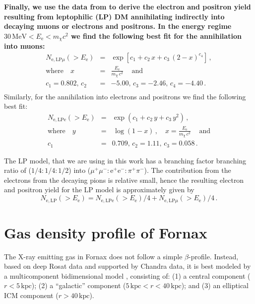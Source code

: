 \documentclass[10pt,aps,pra,reprint,amsmath,amsfonts,amssymb,showpacs,nofootinbib,floatfix]{revtex4-1}
\def\C#1{{\bf #1}}
\newcommand{\rmn}{\mathrm}
\newcommand{\ee}{E_\rmn{e}}
\newcommand{\kpc}{\rmn{kpc}}
\newcommand{\e}{\rmn{e}}
\begin{document}
\C{Finally, we use the data from
  \cite{2011JCAP...03..019C,2011JCAP...03..051C} to derive the
  electron and positron yield resulting from leptophilic (LP) DM
  annihilating indirectly into decaying muons or electrons and
  positrons. In the energy regime $30\,\rmn{MeV}<\ee< m_\chi c^2$ we
  find the following best fit for the annihilation into muons:}
\begin{eqnarray}
N_{\e,\rmn{LP}\mu}(>\ee) &=& \exp\left[c_1+c_2\,x+c_3\,(2-x)^{c_4}\right]
\,,\nonumber\\
\rmn{where}\quad x&=&\frac{\ee}{m_\chi\,c^2}\,\quad\rmn{and}\nonumber\\
c_1=0.802,\,c_2&=&-5.00,\,c_3=-2.46,\,c_4=-4.40\,.\nonumber\\
\label{eq:lp_mu}
\end{eqnarray}
Similarly, for the annihilation into electrons and positrons we find the following best fit:
\begin{eqnarray}
N_{\e,\rmn{LP}\e}(>\ee) &=& \exp\left(c_1+c_2\,y+c_3\,y^2\right)
\,,\nonumber\\
\rmn{where}\quad y&=&\,\log\left(1-x\right)\,,\quad 
x=\frac{\ee}{m_\chi\,c^2}\,\quad\rmn{and}\nonumber\\
c_1&=&0.709,\,c_2=1.11,\,c_3=0.058\,.
\label{eq:lp_ep}
\end{eqnarray}

The LP model, that we are using in this work has a branching factor
branching ratio of ($1/4:1/4:1/2$) into
($\mu^+\mu^-:\e^+\e^-:\pi^+\pi^-$). The contribution from the
electrons from the decaying pions is relative small, hence the
resulting electron and positron yield for the LP model is
approximately given by
\begin{equation}
N_{\e,\rmn{LP}}(>\ee) =
N_{\e,\rmn{LP}\e}(>\ee)/4+N_{\e,\rmn{LP}\mu}(>\ee)/4\,.
\end{equation}

\section{Gas density profile of Fornax}
The X-ray emitting gas in Fornax does not follow a simple
$\beta$-profile. Instead, based on deep Rosat data and supported by
Chandra data, it is best modeled by a multicomponent bidimensional
model \cite{2002ApJ...565..883P}, consisting of: (1) a central
component ($r<5\,\kpc$); (2) a ``galactic'' component
($5\,\kpc<r<40\,\kpc$); and (3) an elliptical ICM component
($r>40\,\kpc$). 
\end{document}
